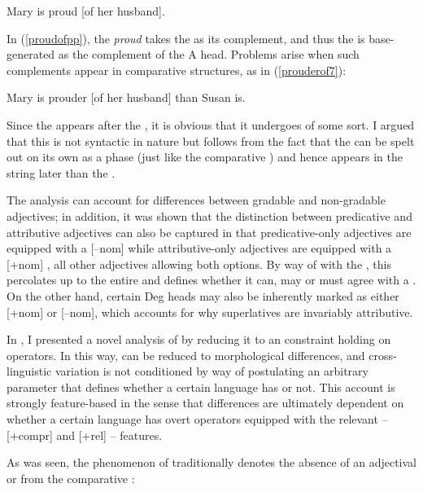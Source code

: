 \ea	Mary is proud [of her husband]. \label{proudofpp}
\z

In (\ref{proudofpp}), the  \textit{proud} takes the  as its complement, and thus the  is base-generated as the complement of the A head. Problems arise when such complements appear in comparative structures, as in (\ref{prouderof7}):

\ea	Mary is prouder [of her husband] than Susan is. \label{prouderof7}
\z

Since the  appears after the , it is obvious that it undergoes  of some sort. I argued that this  is not syntactic in nature but follows from the fact that the  can be spelt out on its own as a phase (just like the comparative ) and hence appears in the  string later than the .

The analysis can account for differences between gradable and non-gradable adjectives; in addition, it was shown that the distinction between predicative and attributive adjectives can also be captured in that predicative-only adjectives are equipped with a [--nom]  while attributive-only adjectives are equipped with a [+nom] , all other adjectives allowing both options. By way of  with the , this  percolates up to the entire  and defines whether it can, may or must agree with a . On the other hand, certain Deg heads may also be inherently marked as either [+nom] or [--nom], which accounts for why superlatives are invariably attributive.

In , I presented a novel analysis of  by reducing it to an  constraint holding on operators. In this way,  can be reduced to morphological differences, and cross-linguistic variation is not conditioned by way of postulating an arbitrary parameter that defines whether a certain language has  or not. This account is strongly feature-based in the sense that differences are ultimately dependent on whether a certain language has overt operators equipped with the relevant -- [+compr] and [+rel] -- features.

As was seen, the phenomenon of  traditionally denotes the absence of an adjectival or  from the comparative :

